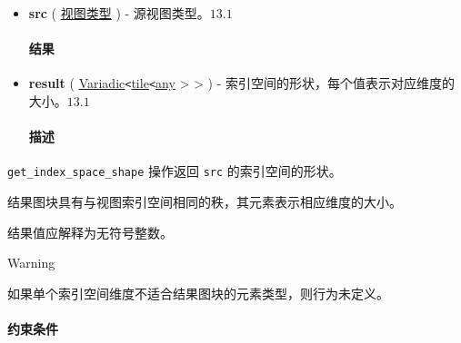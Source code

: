 \documentclass{article}
\begin{document}
\begin{itemize}
\item \textbf{src} ( \href{https://docs.nvidia.com/cuda/tile-ir/latest/sections/operations.html#type-view-type}{视图类型} ) - 源视图类型。$\boxed{13.1}$




\paragraph{结果}


\item \textbf{result} ( \href{https://docs.nvidia.com/cuda/tile-ir/latest/sections/operations.html#type-variadic}{Variadic}\texttt{<}\href{https://docs.nvidia.com/cuda/tile-ir/latest/sections/types.html#type-tile}{tile}\texttt{<}\href{https://docs.nvidia.com/cuda/tile-ir/latest/sections/operations.html#type-any}{any} > > ) - 索引空间的形状，每个值表示对应维度的大小。$\boxed{13.1}$




\paragraph{描述}


\end{itemize}
\texttt{get\_index\_space\_shape} 操作返回 \texttt{src} 的索引空间的形状。



结果图块具有与视图索引空间相同的秩，其元素表示相应维度的大小。



结果值应解释为无符号整数。



Warning




如果单个索引空间维度不适合结果图块的元素类型，则行为未定义。





\paragraph{约束条件}
\end{document}
